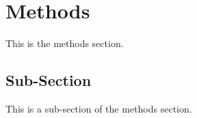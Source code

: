
\section{Methods}
\label{sec:methods}

This is the methods section.

\subsection{Sub-Section}

This is a sub-section of the methods section.
